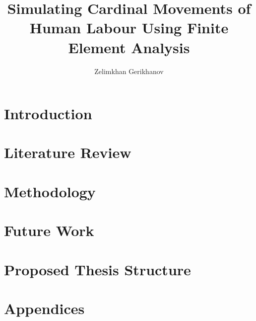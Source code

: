 \documentclass[oneside,12pt]{CUEDthesisPSnPDF}
\title{Simulating Cardinal Movements of Human Labour Using Finite Element Analysis}
\author{Zelimkhan Gerikhanov}
\begin{document}
\maketitle

\listoffixmes
{}
\tableofcontents
\listoffigures
\listoftables



\clearpage
{}

\chapter{Introduction}\label{chap-introduction}


\chapter{Literature Review}\label{chap-literature}



\chapter{Methodology}\label{chap-methodology}







\chapter{Future Work}\label{chap-future}


\chapter{Proposed Thesis Structure}\label{chap-thesis}



%


\chapter{Appendices}


\end{document}
